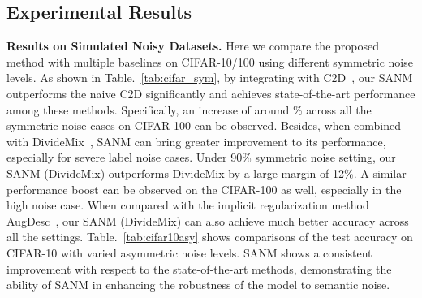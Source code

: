 \documentclass[10pt,twocolumn,letterpaper]{article}
\begin{document}
\subsection{Experimental Results}
\vspace{-.5em}
 \textbf{Results on Simulated Noisy Datasets.} Here we compare the proposed method with multiple baselines on CIFAR-10/100 using different symmetric noise levels. As shown in Table.~\ref{tab:cifar_sym}, by integrating with C2D~\cite{zheltonozhskii2022contrast}, our SANM outperforms the naive C2D significantly and achieves state-of-the-art performance among these methods. Specifically, an increase of around \% across all the symmetric noise cases on CIFAR-100 can be observed. Besides, when combined with DivideMix~\cite{li2020dividemix}, SANM can bring greater improvement to its performance, especially for severe label noise cases. Under 90\% symmetric noise setting, our SANM (DivideMix) outperforms DivideMix by a large margin of 12\%. A similar performance boost can be observed on the CIFAR-100 as well, especially in the high noise case. When compared with the implicit regularization method AugDesc~\cite{nishi2021augmentation}, our SANM (DivideMix) can also achieve much better accuracy across all the settings. Table.~\ref{tab:cifar10asy} shows comparisons of the test accuracy on CIFAR-10 with varied asymmetric noise levels. SANM shows a consistent improvement with respect to the state-of-the-art methods, demonstrating the ability of SANM in enhancing the robustness of the model to semantic noise. 
\end{document}
